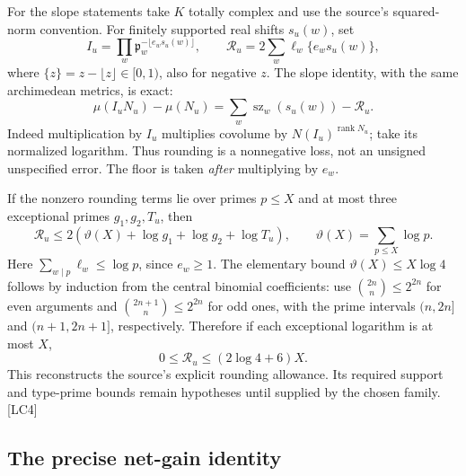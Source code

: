 For the slope statements take $K$ totally complex and use the source's squared-norm convention. For finitely supported real shifts $s_u(w)$, set
\[
I_u=\prod_w\mathfrak p_w^{-\lfloor e_ws_u(w)\rfloor},\qquad
\mathcal R_u=2\sum_w\ell_w\{e_ws_u(w)\},
\]
where $\{z\}=z-\lfloor z\rfloor\in[0,1)$, also for negative $z$. The slope identity, with the same archimedean metrics, is exact:
\begin{equation}\label{eq:round-exact}
\mu(I_uN_u)-\mu(N_u)
=\sum_w\operatorname{sz}_w(s_u(w))-\mathcal R_u.
\end{equation}
Indeed multiplication by $I_u$ multiplies covolume by $N(I_u)^{\operatorname{rank}N_u}$; take its normalized logarithm. Thus rounding is a nonnegative loss, not an unsigned unspecified error. The floor is taken \emph{after} multiplying by $e_w$.\cite{local-div-defs}

If the nonzero rounding terms lie over primes $p\le X$ and at most three exceptional primes $g_1,g_2,T_u$, then
\[
\mathcal R_u\le2\left(\vartheta(X)+\log g_1+\log g_2+\log T_u\right),
\qquad \vartheta(X)=\sum_{p\le X}\log p.
\]
Here $\sum_{w\mid p}\ell_w\le\log p$, since $e_w\ge1$. The elementary bound $\vartheta(X)\le X\log4$ follows by induction from the central binomial coefficients: use $\binom{2n}{n}\le2^{2n}$ for even arguments and $\binom{2n+1}{n}\le2^{2n}$ for odd ones, with the prime intervals $(n,2n]$ and $(n+1,2n+1]$, respectively. Therefore if each exceptional logarithm is at most $X$,
\begin{equation}\label{eq:round-source}
0\le\mathcal R_u\le(2\log4+6)X.
\end{equation}
This reconstructs the source's explicit rounding allowance. Its required support and type-prime bounds remain hypotheses until supplied by the chosen family. \textsf{[LC4]}\cite{local-rounding}

\subsection{The precise net-gain identity}

